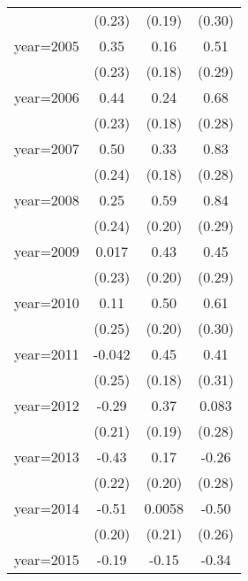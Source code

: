 \begin{sidewaystable}[htbp]
\begin{tabular}{l*{3}{c}}
                &   (0.23)         &   (0.19)         &   (0.30)         \\
\addlinespace
year=2005       &     0.35         &     0.16         &     0.51\sym{*}  \\
                &   (0.23)         &   (0.18)         &   (0.29)         \\
\addlinespace
year=2006       &     0.44\sym{*}  &     0.24         &     0.68\sym{**} \\
                &   (0.23)         &   (0.18)         &   (0.28)         \\
\addlinespace
year=2007       &     0.50\sym{**} &     0.33\sym{*}  &     0.83\sym{***}\\
                &   (0.24)         &   (0.18)         &   (0.28)         \\
\addlinespace
year=2008       &     0.25         &     0.59\sym{***}&     0.84\sym{***}\\
                &   (0.24)         &   (0.20)         &   (0.29)         \\
\addlinespace
year=2009       &    0.017         &     0.43\sym{**} &     0.45         \\
                &   (0.23)         &   (0.20)         &   (0.29)         \\
\addlinespace
year=2010       &     0.11         &     0.50\sym{**} &     0.61\sym{**} \\
                &   (0.25)         &   (0.20)         &   (0.30)         \\
\addlinespace
year=2011       &   -0.042         &     0.45\sym{**} &     0.41         \\
                &   (0.25)         &   (0.18)         &   (0.31)         \\
\addlinespace
year=2012       &    -0.29         &     0.37\sym{*}  &    0.083         \\
                &   (0.21)         &   (0.19)         &   (0.28)         \\
\addlinespace
year=2013       &    -0.43\sym{**} &     0.17         &    -0.26         \\
                &   (0.22)         &   (0.20)         &   (0.28)         \\
\addlinespace
year=2014       &    -0.51\sym{**} &   0.0058         &    -0.50\sym{*}  \\
                &   (0.20)         &   (0.21)         &   (0.26)         \\
\addlinespace
year=2015       &    -0.19         &    -0.15         &    -0.34         \\

\end{tabular}
\end{sidewaystable}
